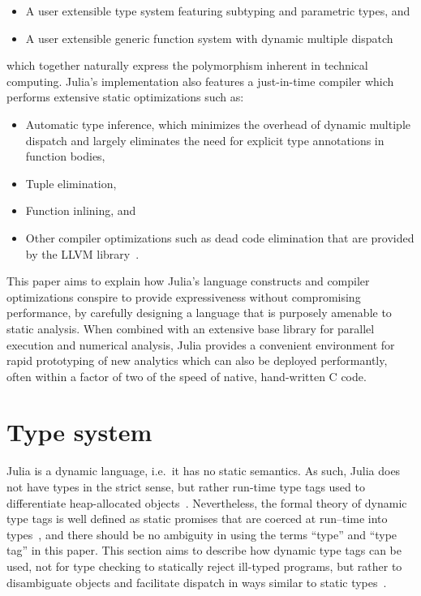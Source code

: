 \documentclass[pldi]{sigplanconf-pldi15}
\begin{document}
\begin{itemize}
	\item A user extensible type system featuring subtyping and parametric
		types, and
	\item A user extensible generic function system with dynamic multiple
		dispatch
\end{itemize}
%
which together naturally express the polymorphism inherent in technical
computing. Julia's implementation also features a just-in-time compiler which
performs extensive static optimizations such as:

\begin{itemize}
	\item Automatic type inference, which minimizes the overhead of dynamic
		multiple dispatch and largely eliminates the need for explicit
		type annotations in function bodies,

	\item Tuple elimination,
	\item Function inlining, and
	\item Other compiler optimizations such as dead code elimination that
		are provided by the LLVM library~\cite{Lattner2004}.
\end{itemize}

This paper aims to explain how Julia's language constructs and compiler
optimizations conspire to provide expressiveness without compromising
performance, by carefully designing a language that is purposely amenable to
static analysis. When combined with an extensive base library for parallel
execution and numerical analysis, Julia provides a convenient environment for
rapid prototyping of new analytics which can also be deployed performantly,
often within a factor of two of the speed of native, hand-written C code.



\section{Type system}

Julia is a dynamic language, i.e.\ it has no static semantics. As such, Julia
does not have types in the strict sense, but rather run-time type tags used to
differentiate heap-allocated objects~\cite[Section 11.10, p. 142]{Pierce2002}.
Nevertheless, the formal theory of dynamic type tags is well defined as static
promises that are coerced at run--time into 
types~\cite{Henglein1994,Shields1998,Baars2002}, and there should be no ambiguity
in using the terms ``type'' and ``type tag'' in this paper. This
section aims to describe how dynamic type tags can be used, not for type
checking to statically reject ill-typed programs, but rather to disambiguate
objects and facilitate dispatch in ways similar to static
types~\cite{Tratt2009,Kell2014}.
\end{document}
